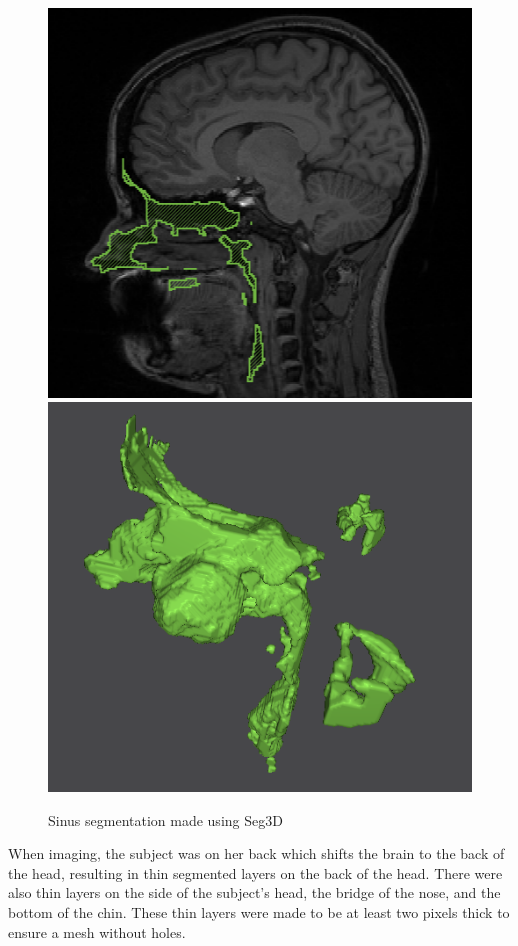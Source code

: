 \begin{figure}[H]
\begin{center}
\includegraphics[width=.49\textwidth]{Figures/sinus_sag}
\includegraphics[width=.49\textwidth]{Figures/sinus_iso}
\caption{Sinus segmentation made using Seg3D}
\label{fig:sinus}
\end{center}
\end{figure}

When imaging, the subject was on her back which shifts the brain to the back of the head, resulting in thin segmented layers on the back of the head. There were also thin layers on the side of the subject's head, the bridge of the nose, and the bottom of the chin. These thin layers were made to be at least two pixels thick to ensure a mesh without holes.

